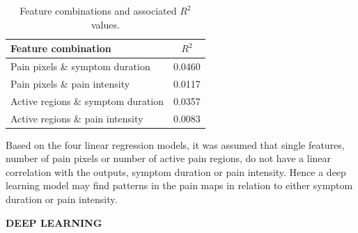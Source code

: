\begin{table}[h]
\centering
\begin{tabular}{@{}lc@{}}
\toprule
{\textbf{Feature combination}} & \textbf{$R^2$} \\ \midrule
Pain pixels \& symptom duration                  & 0.0460         \\
Pain pixels \& pain intensity                    & 0.0117         \\
Active regions \& symptom duration               & 0.0357         \\
Active regions \& pain intensity                 & 0.0083         \\ \bottomrule
\end{tabular}
\caption{Feature combinations and associated $R^2$ values.}
\label{tab:Rvalues}
\end{table}

\noindent
Based on the four linear regression models, it was assumed that single features, number of pain pixels or number of active pain regions, do not have a linear correlation with the outputs, symptom duration or pain intensity. Hence a deep learning model may find patterns in the pain maps in relation to either symptom duration or pain intensity. \newline

\noindent
\textbf{DEEP LEARNING}
\noindent
